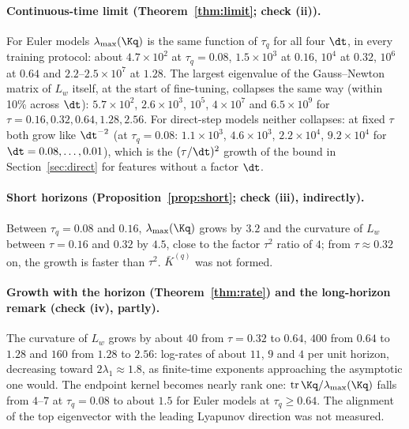 \paragraph{Continuous-time limit (Theorem~\ref{thm:limit}; check (ii)).}
For Euler models $\lambda_{\max}(\Kq)$ is the same function of $\tau_q$ for all four $\dt$, in every training protocol: about $4.7\times10^2$ at $\tau_q = 0.08$, $1.5\times10^3$ at $0.16$, $10^4$ at $0.32$, $10^6$ at $0.64$ and $2.2$--$2.5\times10^7$ at $1.28$.
The largest eigenvalue of the Gauss--Newton matrix of $L_w$ itself, at the start of fine-tuning, collapses the same way (within 10\% across $\dt$): $5.7\times10^2$, $2.6\times10^3$, $10^5$, $4\times10^7$ and $6.5\times10^9$ for $\tau = 0.16, 0.32, 0.64, 1.28, 2.56$.
For direct-step models neither collapses: at fixed $\tau$ both grow like $\dt^{-2}$ (at $\tau_q = 0.08$: $1.1\times10^3$, $4.6\times10^3$, $2.2\times10^4$, $9.2\times10^4$ for $\dt = 0.08,\dots,0.01$), which is the $(\tau/\dt)^2$ growth of the bound in Section~\ref{sec:direct} for features without a factor $\dt$.

\paragraph{Short horizons (Proposition~\ref{prop:short}; check (iii), indirectly).}
Between $\tau_q = 0.08$ and $0.16$, $\lambda_{\max}(\Kq)$ grows by $3.2$ and the curvature of $L_w$ between $\tau = 0.16$ and $0.32$ by $4.5$, close to the factor $\tau^2$ ratio of $4$; from $\tau\approx0.32$ on, the growth is faster than $\tau^2$.
$\bar K^{(q)}$ was not formed.

\paragraph{Growth with the horizon (Theorem~\ref{thm:rate}) and the long-horizon remark (check (iv), partly).}
The curvature of $L_w$ grows by about $40$ from $\tau = 0.32$ to $0.64$, $400$ from $0.64$ to $1.28$ and $160$ from $1.28$ to $2.56$: log-rates of about $11$, $9$ and $4$ per unit horizon, decreasing toward $2\lambda_1\approx1.8$, as finite-time exponents approaching the asymptotic one would.
The endpoint kernel becomes nearly rank one: $\operatorname{tr}\Kq/\lambda_{\max}(\Kq)$ falls from $4$--$7$ at $\tau_q = 0.08$ to about $1.5$ for Euler models at $\tau_q\ge0.64$.
The alignment of the top eigenvector with the leading Lyapunov direction was not measured.

